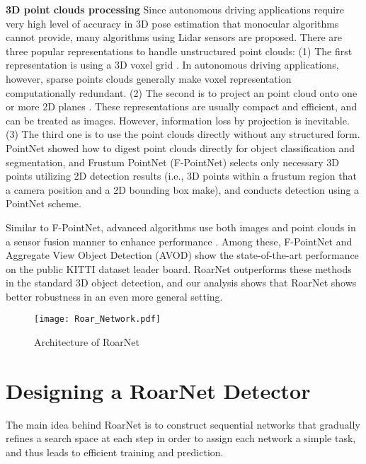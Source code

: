 \documentclass[letterpaper, 10 pt, conference]{ieeeconf}
\newcommand{\subsec}{\quad}
\begin{document}
\textbf{3D point clouds processing\subsec} Since autonomous driving applications require very high level of accuracy in 3D pose estimation that monocular algorithms cannot provide, many algorithms using Lidar sensors are proposed. There are three popular representations to handle unstructured point clouds: (1) The first representation is using a 3D voxel grid \cite{zeng_wang_voting_2015,li_vehicle_2016-1,engelcke_vote3deep_2017-1}. In autonomous driving applications, however, sparse points clouds generally make voxel representation computationally redundant. (2) The second is to project an point cloud onto one or more 2D planes \cite{luo_fast_2018,simon_complex-yolo_2018,yang_pixor_2018}. These representations are usually compact and efficient, and can be treated as images. However, information loss by projection is inevitable. (3) The third one is to use the point clouds directly without any structured form. PointNet \cite{qi_pointnet_2017, qi_pointnet++_2017} showed how to digest point clouds directly for object classification and segmentation, and Frustum PointNet (F-PointNet) \cite{qi_frustum_2018} selects only necessary 3D points utilizing 2D detection results (i.e., 3D points within a frustum region that a camera position and a 2D bounding box make), and conducts detection using a PointNet scheme.

Similar to F-PointNet, advanced algorithms use both images and point clouds in a sensor fusion manner to enhance performance \cite{ku_joint_2017,liang_deep_2018}. Among these, F-PointNet and Aggregate View Object Detection (AVOD) \cite{ku_joint_2017} show the state-of-the-art performance on the public KITTI dataset leader board. RoarNet outperforms these methods in the standard 3D object detection, and our analysis shows that RoarNet shows better robustness in an even more general setting.

\begin{figure*}[t]
  \centering
  \texttt{[image: Roar\_Network.pdf]}
\caption{Architecture of RoarNet}
  \label{fig:3D_Detection_Network}
\end{figure*}

\section{Designing a RoarNet Detector}
The main idea behind RoarNet is to construct sequential networks that gradually refines a search space at each step in order to assign each network a simple task, and thus leads to efficient training and prediction.
\end{document}
